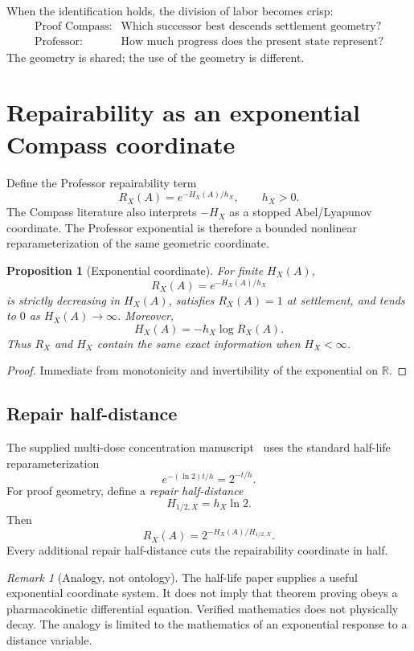 \documentclass[11pt]{article}
\newtheorem{proposition}[theorem]{Proposition}
\theoremstyle{definition}
\theoremstyle{remark}
\newtheorem{remark}[theorem]{Remark}
\newcommand{\R}{\mathbb R}
\begin{document}
When the identification holds, the division of labor becomes crisp:
\[
\begin{array}{ll}
\text{Proof Compass:} & \text{Which successor best descends settlement geometry?}\\[2mm]
\text{Professor:} & \text{How much progress does the present state represent?}
\end{array}
\]
The geometry is shared; the use of the geometry is different.

\section{Repairability as an exponential Compass coordinate}

Define the Professor repairability term
\[
R_X(A)=e^{-H_X(A)/h_X},\qquad h_X>0.
\]
The Compass literature also interprets $-H_X$ as a stopped Abel/Lyapunov coordinate. The Professor exponential is therefore a bounded nonlinear reparameterization of the same geometric coordinate.

\begin{proposition}[Exponential coordinate]
For finite $H_X(A)$,
\[
\boxed{R_X(A)=e^{-H_X(A)/h_X}}
\]
is strictly decreasing in $H_X(A)$, satisfies $R_X(A)=1$ at settlement, and tends to $0$ as $H_X(A)\to\infty$. Moreover,
\[
H_X(A)=-h_X\log R_X(A).
\]
Thus $R_X$ and $H_X$ contain the same exact information when $H_X<\infty$.
\end{proposition}

\begin{proof}
Immediate from monotonicity and invertibility of the exponential on $\R$.
\end{proof}

\subsection{Repair half-distance}

The supplied multi-dose concentration manuscript~\cite{halflife} uses the standard half-life reparameterization
\[
e^{-(\ln 2)t/h}=2^{-t/h}.
\]
For proof geometry, define a \emph{repair half-distance}
\[
\boxed{H_{1/2,X}=h_X\ln 2.}
\]
Then
\[
\boxed{R_X(A)=2^{-H_X(A)/H_{1/2,X}}.}
\]
Every additional repair half-distance cuts the repairability coordinate in half.

\begin{remark}[Analogy, not ontology]
The half-life paper supplies a useful exponential coordinate system. It does not imply that theorem proving obeys a pharmacokinetic differential equation. Verified mathematics does not physically decay. The analogy is limited to the mathematics of an exponential response to a distance variable.
\end{remark}
\end{document}
